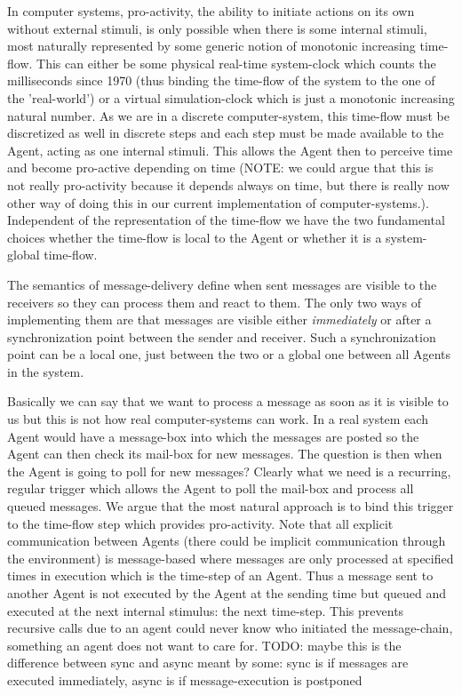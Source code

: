 In computer systems, pro-activity, the ability to initiate actions on its own without external stimuli, is only possible when there is some internal stimuli, most naturally represented by some generic notion of monotonic increasing time-flow. This can either be some physical real-time system-clock which counts the milliseconds since 1970 (thus binding the time-flow of the system to the one of the 'real-world') or a virtual simulation-clock which is just a monotonic increasing natural number. As we are in a discrete computer-system, this time-flow must be discretized as well in discrete steps and each step must be made available to the Agent, acting as one internal stimuli. This allows the Agent then to perceive time and become pro-active depending on time (NOTE: we could argue that this is not really pro-activity because it depends always on time, but there is really now other way of doing this in our current implementation of computer-systems.). Independent of the representation of the time-flow we have the two fundamental choices whether the time-flow is local to the Agent or whether it is a system-global time-flow.

\medskip 

The semantics of message-delivery define when sent messages are visible to the receivers so they can process them and react to them. The only two ways of implementing them are that messages are visible either \textit{immediately} or after a synchronization point between the sender and receiver. Such a synchronization point can be a local one, just between the two or a global one between all Agents in the system.

\medskip 

Basically we can say that we want to process a message as soon as it is visible to us but this is not how real computer-systems can work. In a real system each Agent would have a message-box into which the messages are posted so the Agent can then check its mail-box for new messages. The question is then when the Agent is going to poll for new messages? Clearly what we need is a recurring, regular trigger which allows the Agent to poll the mail-box and process all queued messages. We argue that the most natural approach is to bind this trigger to the time-flow step which provides pro-activity. Note that all explicit communication between Agents (there could be implicit communication through the environment) is message-based where messages are only processed at specified times in execution which is the time-step of an Agent. Thus a message sent to another Agent is not executed by the Agent at the sending time but queued and executed at the next internal stimulus: the next time-step. This prevents recursive calls due to an agent could never know who initiated the message-chain, something an agent does not want to care for.
TODO: maybe this is the difference between sync and async meant by some: sync is if messages are executed immediately, async is if message-execution is postponed 

